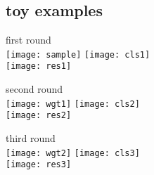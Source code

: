 \documentclass[fleqn,aspectratio=1610]{beamer}
\begin{document}
\subsection{toy examples}
\label{sec:org3e647c3}

\begin{frame}[label={sec:org6422b3d}]{}
\begin{center}
first round\\
\texttt{[image: sample]}
\hspace*{20pt}
\texttt{[image: cls1]}
\\
\texttt{[image: res1]}
\hspace*{20pt}
\hspace*{.42\textheight}
\end{center}
\end{frame}

\begin{frame}[label={sec:org4c5bfc0}]{}
\begin{center}
second round\\
\texttt{[image: wgt1]}
\hspace*{20pt}
\texttt{[image: cls2]}
\\
\texttt{[image: res2]}
\hspace*{20pt}
\hspace*{.42\textheight}
\end{center}
\end{frame}

\begin{frame}[label={sec:org16cd452}]{}
\begin{center}
third round\\
\texttt{[image: wgt2]}
\hspace*{20pt}
\texttt{[image: cls3]}
\\
\texttt{[image: res3]}
\hspace*{20pt}
\hspace*{.42\textheight}
\end{center}
\end{frame}
\end{document}
